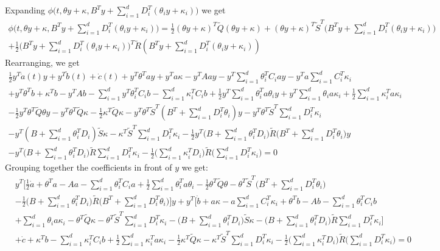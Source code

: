 Expanding $\phi\bigg(t, \theta y + \kappa, B^T y + \sum_{i=1}^d D_i^T (\theta_i y + \kappa_i) \bigg) $ we get
\begin{align*}
    \phi\bigg(t, \theta y + \kappa, B^T y + \sum_{i=1}^d D_i^T (\theta_i y + \kappa_i) \bigg) 
    = \frac12 (\theta y + \kappa)^T \tilde{Q}(\theta y + \kappa)+ (\theta y + \kappa)^T \tilde{S}^T \big(B^T y + \sum_{i=1}^d D_i^T (\theta_i y + \kappa_i)\big)\\
    + \frac12\big(B^T y + \sum_{i=1}^d D_i^T (\theta_i y + \kappa_i)\big)^T \tilde{R}(B^T y + \sum_{i=1}^d D_i^T (\theta_i y + \kappa_i))
\end{align*}
Rearranging, we get 
\begin{align*}
     \frac12 y^T \dot{a}(t) y + y^T \dot{b}(t) + \dot{c}(t) + y^T\theta^T a y + y^T a \kappa - y^T A a y - y^T \sum_{i=1}^d \theta_i^T C_i a y - y^T a \sum_{i=1}^d C_i^T \kappa_i\\
     + y^T \theta^T b + \kappa^T b - y^T A b - \sum_{i=1}^d y^T \theta_i^T C_i b - \sum_{i=1}^d \kappa_i^T C_i b + \frac12 y^T \sum_{i=1}^d\theta_i^T a \theta_i y + y^T \sum_{i=1}^d\theta_i a \kappa_i + \frac12 \sum_{i=1}^d\kappa_i^T a \kappa_i\\
     - \frac12 y^T \theta^T \tilde{Q}\theta y - y^T \theta^T \tilde{Q}\kappa - \frac12 \kappa^T \tilde{Q}\kappa - y^T \theta^T \tilde{S}^T (B^T + \sum_{i=1}^d D_i^T \theta_i)y - y^T \theta^T \tilde{S}^T\sum_{i=1}^d D_i^T \kappa_i\\
     - y^T(B + \sum_{i=1}^d \theta_i^T D_i)\tilde{S}\kappa - \kappa^T \tilde{S}^T \sum_{i=1}^d D_i^T \kappa_i -\frac12 y^T\bigg(B + \sum_{i=1}^d\theta_i^T D_i\bigg) \tilde{R} \bigg(B^T + \sum_{i=1}^d D_i^T \theta_i\bigg)y\\
     - y^T\bigg(B + \sum_{i=1}^d\theta_i^T D_i\bigg) \tilde{R} \sum_{i=1}^d D_i^T \kappa_i - \frac12 \bigg(\sum_{i=1}^d\kappa_i^T D_i\bigg) \tilde{R} \bigg(\sum_{i=1}^d D_i^T \kappa_i\bigg) = 0
\end{align*}
Grouping together the coefficients in front of $y$ we get:
\begin{align*}
    &y^T \bigg[ \frac12 \dot{a} + \theta^T a - A a  - \sum_{i=1}^d \theta_i^T C_i a + \frac12 \sum_{i=1}^d \theta_i^T a \theta_i - \frac12 \theta^T \tilde{Q}\theta - \theta^T \tilde{S}^T \big(B^T + \sum_{i=1}^d D_i^T \theta_i \big)\\
    &- \frac12 \bigg(B + \sum_{i=1}^d\theta_i^T D_i\bigg) \tilde{R} \bigg(B^T + \sum_{i=1}^d D_i^T \theta_i\bigg) \bigg]y + y^T \bigg[ \dot{b} + a \kappa - a \sum_{i=1}^d C_i^T \kappa_i + \theta^T b - Ab - \sum_{i=1}^d \theta_i^T C_i b\\
    &+ \sum_{i=1}^d\theta_i a \kappa_i - \theta^T \tilde{Q} \kappa - \theta^T \tilde{S}^T \sum_{i=1}^d D_i^T \kappa_i - \big(B + \sum_{i=1}^d\theta_i^T D_i \big)\tilde{S}\kappa - \big( B + \sum_{i=1}^d \theta_i^T D_i \big) \tilde{R} \sum_{i=1}^dD_i^T \kappa_i  \bigg]\\
    &+ \dot{c} + \kappa^T b - \sum_{i=1}^d\kappa_i^T C_i b + \frac12 \sum_{i=1}^d\kappa_i^T a \kappa_i - \frac12 \kappa^T \tilde{Q}\kappa - \kappa^T \tilde{S}^T \sum_{i=1}^d D_i^T\kappa_i - \frac12 \bigg(\sum_{i=1}^d\kappa_i^T D_i\bigg) \tilde{R} \bigg(\sum_{i=1}^d D_i^T \kappa_i\bigg) = 0
\end{align*}

